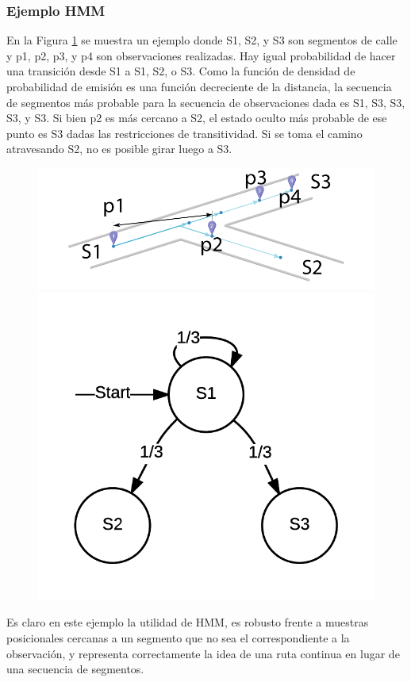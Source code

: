 \subsubsection{Ejemplo HMM}
En la Figura \ref{fig:momex} se muestra un ejemplo donde S1, S2, y S3 son segmentos de calle y p1, p2, p3, y p4 son observaciones realizadas. Hay igual probabilidad de hacer una transición desde S1 a S1, S2, o S3. Como la función de densidad de probabilidad de emisión es una función decreciente de la distancia, la secuencia de segmentos más probable para la secuencia de observaciones dada es S1, S3, S3, S3, y S3. Si bien p2 es más cercano a S2, el estado oculto más probable de ese punto es S3 dadas las restricciones de transitividad. Si se toma el camino atravesando S2, no es posible girar luego a S3.

\begin{figure}[H]
\centering
\begin{minipage}{.5\textwidth}
  \centering
  \includegraphics[width=1\linewidth]{images/detecciones.png}  
\end{minipage}%
\begin{minipage}{.5\textwidth}
  \centering
  \includegraphics[width=0.5\linewidth]{images/mom-segmentos.png}  
\end{minipage}%
	\label{fig:momex}
\end{figure}

Es claro en este ejemplo la utilidad de HMM, es robusto frente a muestras posicionales cercanas a un segmento que no sea el correspondiente a la observación, y representa correctamente la idea de una ruta continua en lugar de una secuencia de segmentos.

